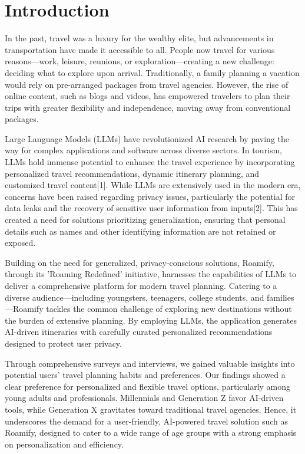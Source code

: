 \documentclass[sigconf,authordraft]{acmart}
\begin{document}
\section{Introduction}
In the past, travel was a luxury for the wealthy elite, but advancements in transportation have made it accessible to all. People now travel for various reasons—work, leisure, reunions, or exploration—creating a new challenge: deciding what to explore upon arrival. Traditionally, a family planning a vacation would rely on pre-arranged packages from travel agencies. However, the rise of online content, such as blogs and videos, has empowered travelers to plan their trips with greater flexibility and independence, moving away from conventional packages.

Large Language Models (LLMs) have revolutionized AI research by paving the way for complex applications and software across diverse sectors. In tourism, LLMs hold immense potential to enhance the travel experience by incorporating personalized travel recommendations, dynamic itinerary planning, and customized travel content[1]. While LLMs are extensively used in the modern era, concerns have been raised regarding privacy issues, particularly the potential for data leaks and the recovery of sensitive user information from inputs[2]. This has created a need for solutions prioritizing generalization, ensuring that personal details such as names and other identifying information are not retained or exposed.

Building on the need for generalized, privacy-conscious solutions, Roamify, through its 'Roaming Redefined' initiative, harnesses the capabilities of LLMs to deliver a comprehensive platform for modern travel planning. Catering to a diverse audience—including youngsters, teenagers, college students, and families—Roamify tackles the common challenge of exploring new destinations without the burden of extensive planning. By employing LLMs, the application generates AI-driven itineraries with carefully curated personalized recommendations designed to protect user privacy.

Through comprehensive surveys and interviews, we gained valuable insights into potential users' travel planning habits and preferences. Our findings showed a clear preference for personalized and flexible travel options, particularly among young adults and professionals. Millennials and Generation Z favor AI-driven tools, while Generation X gravitates toward traditional travel agencies. Hence, it underscores the demand for a user-friendly, AI-powered travel solution such as Roamify, designed to cater to a wide range of age groups with a strong emphasis on personalization and efficiency.
\end{document}

